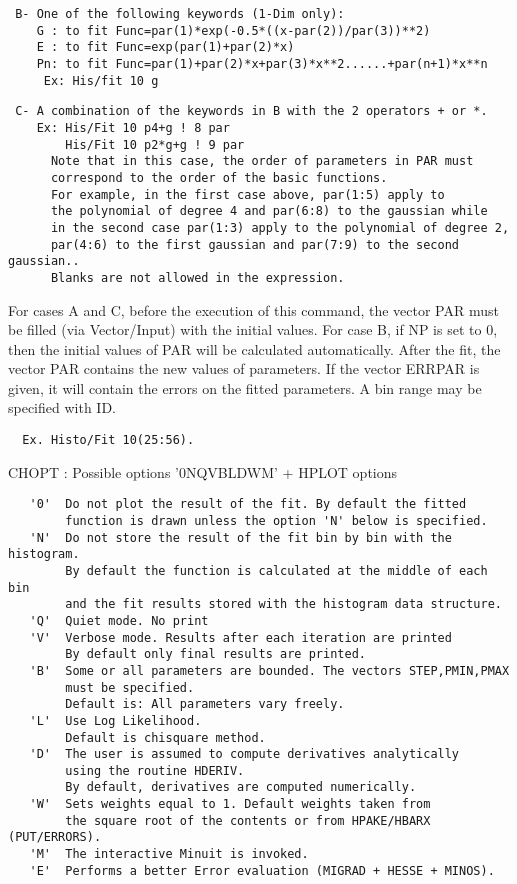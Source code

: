 \begin{verbatim}
 B- One of the following keywords (1-Dim only):
    G : to fit Func=par(1)*exp(-0.5*((x-par(2))/par(3))**2)
    E : to fit Func=exp(par(1)+par(2)*x)
    Pn: to fit Func=par(1)+par(2)*x+par(3)*x**2......+par(n+1)*x**n
     Ex: His/fit 10 g
\end{verbatim}

\begin{verbatim}
 C- A combination of the keywords in B with the 2 operators + or *.
    Ex: His/Fit 10 p4+g ! 8 par
        His/Fit 10 p2*g+g ! 9 par
      Note that in this case, the order of parameters in PAR must
      correspond to the order of the basic functions.
      For example, in the first case above, par(1:5) apply to
      the polynomial of degree 4 and par(6:8) to the gaussian while
      in the second case par(1:3) apply to the polynomial of degree 2,
      par(4:6) to the first gaussian and par(7:9) to the second gaussian..
      Blanks are not allowed in the expression.
\end{verbatim}
For cases A and C, before the execution of this command, the vector PAR
must be filled (via Vector/Input) with the initial values.
For case B, if NP is set to 0, then the initial values of PAR
will be calculated automatically.
After the fit, the vector PAR contains the new values
of parameters. If the vector ERRPAR is given, it will contain
the errors on the fitted parameters.
A bin range may be specified with ID.
\begin{verbatim}
  Ex. Histo/Fit 10(25:56).
\end{verbatim}
CHOPT : Possible options '0NQVBLDWM' + HPLOT options
\begin{verbatim}
   '0'  Do not plot the result of the fit. By default the fitted
        function is drawn unless the option 'N' below is specified.
   'N'  Do not store the result of the fit bin by bin with the histogram.
        By default the function is calculated at the middle of each bin
        and the fit results stored with the histogram data structure.
   'Q'  Quiet mode. No print
   'V'  Verbose mode. Results after each iteration are printed
        By default only final results are printed.
   'B'  Some or all parameters are bounded. The vectors STEP,PMIN,PMAX
        must be specified.
        Default is: All parameters vary freely.
   'L'  Use Log Likelihood.
        Default is chisquare method.
   'D'  The user is assumed to compute derivatives analytically
        using the routine HDERIV.
        By default, derivatives are computed numerically.
   'W'  Sets weights equal to 1. Default weights taken from
        the square root of the contents or from HPAKE/HBARX (PUT/ERRORS).
   'M'  The interactive Minuit is invoked.
   'E'  Performs a better Error evaluation (MIGRAD + HESSE + MINOS).
\end{verbatim}
\ENDTEXT


